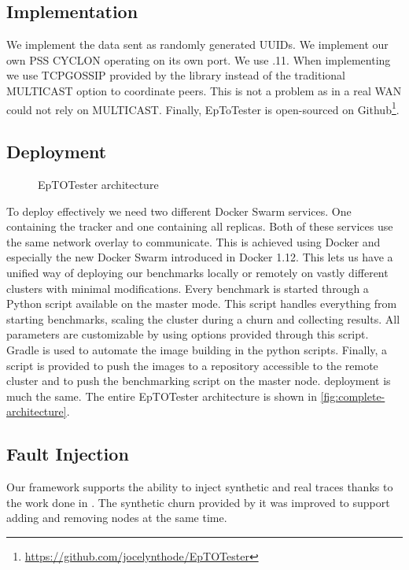 \subsection{Implementation}
We implement the data sent as randomly generated UUIDs. We implement our own PSS CYCLON operating on its own port. We use .11. When implementing \jgroups we use TCPGOSSIP provided by the \jgroups library instead of the traditional MULTICAST option to coordinate peers. This is not a problem as in a real WAN \jgroups could not rely on MULTICAST. Finally, EpToTester is open-sourced on Github\footnote{\href{https://github.com/jocelynthode/EpTOTester}{https://github.com/jocelynthode/EpTOTester}}.
\subsection{Deployment}
\begin{figure}[htp]
	\centering
	
	\vspace{-2mm} 
	\caption{EpTOTester architecture}
	\vspace{-2mm} 
	\label{fig:complete-architecture}
\end{figure}
To deploy \epto effectively we need two different Docker Swarm services. One containing the tracker and one containing all \epto replicas. Both of these services use the same network overlay to communicate. This is achieved using Docker and especially the new Docker Swarm introduced in Docker 1.12. This lets us have a unified way of deploying our benchmarks locally or remotely on vastly different clusters with minimal modifications. Every benchmark is started through a Python script available on the master mode. This script handles everything from starting benchmarks, scaling the cluster during a churn and collecting results. All \epto parameters are customizable by using options provided through this script.
Gradle is used to automate the image building in the python scripts. Finally, a script is provided to push the images to a repository accessible to the remote cluster and to push the benchmarking script on the master node. \jgroups deployment is much the same. The entire EpTOTester architecture is shown in \autoref{fig:complete-architecture}. 
\subsection{Fault Injection}
Our framework supports the ability to inject synthetic and real traces thanks to the work done in \autocite{vaucher2016erasure}. The synthetic churn provided by it was improved to support adding and removing nodes at the same time.